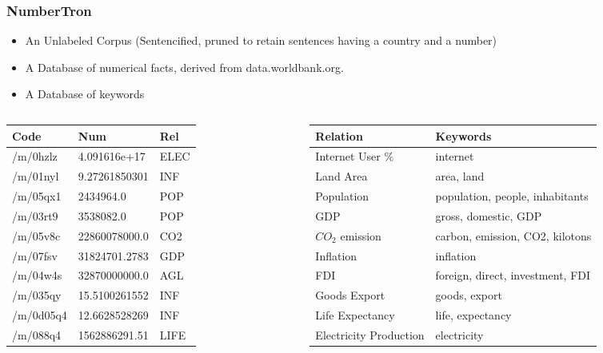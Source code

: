 \documentclass{beamer}
\begin{document}
\begin{frame}
\frametitle{NumberTron}
\begin{itemize}
 \item An Unlabeled Corpus (Sentencified, pruned to retain sentences having a country and a number)
 \item A Database of numerical facts, derived from data.worldbank.org.
 \item A Database of keywords
\end{itemize}
\begin{columns}[T] %
\begin{column}{.48\textwidth}
\begin{adjustbox}{max width=\textwidth}
\begin{tabular}{|l|l|l|}
\hline
 Code & Num & Rel \\
\hline
/m/0hzlz&4.091616e+17&ELEC\\
/m/01nyl&9.27261850301&INF\\
/m/05qx1&2434964.0&POP\\
/m/03rt9&3538082.0&POP\\
/m/05v8c&22860078000.0&CO2\\
/m/07fsv&31824701.2783&GDP\\
/m/04w4s&32870000000.0&AGL\\
/m/035qy&15.5100261552&INF\\
/m/0d05q4&12.6628528269&INF\\
/m/088q4&1562886291.51&LIFE\\
\hline
\end{tabular}
\end{adjustbox}
\end{column}%
\hfill%
\begin{column}{.48\textwidth}
\begin{table}
\begin{adjustbox}{max width=\textwidth}
\begin{tabular}{|l|l|}
\hline 
 Relation & Keywords\\
\hline
 Internet User \% &internet\\
Land Area &area, land\\
Population &population, people, inhabitants\\
GDP & gross, domestic, GDP\\
$CO_2$ emission & carbon, emission, CO2, kilotons\\
Inflation & inflation\\
FDI &foreign, direct, investment, FDI\\
Goods Export & goods, export\\
Life Expectancy & life, expectancy\\
Electricity Production & electricity\\
\hline
\end{tabular}
\end{adjustbox}
\label{table:keywords}
\end{table}
\end{column}%

\end{columns}

\end{frame}
\end{document}
